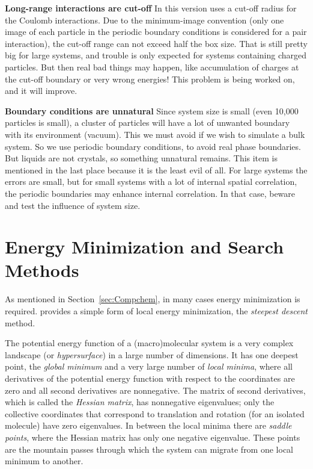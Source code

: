 {\bf Long-range interactions are cut-off}
In this version {\gromacs} uses a cut-off radius for the Coulomb
interactions. Due to the minimum-image convention (only one image of
each particle in the periodic boundary conditions is considered for a
pair interaction), the cut-off range can not exceed half the box
size. That is still pretty big for large systems, and trouble is only
expected for systems containing charged particles. But then real bad
things may happen, like accumulation of charges at the cut-off
boundary or very wrong energies! This problem is being worked on, and
it will improve.

{\bf Boundary conditions are unnatural}
Since system size is small (even 10,000 particles is small), a cluster
of particles will have a lot of unwanted boundary with its environment
(vacuum). This we must avoid if we wish to simulate a bulk system. So
we use periodic boundary conditions, to avoid real phase
boundaries. But liquids are not crystals, so something unnatural
remains. This item is mentioned in the last place because it is the
least evil of all. For large systems the errors are small, but for
small systems with a lot of internal spatial correlation, the periodic
boundaries may enhance internal correlation. In that case, beware and
test the influence of system size.

\section{Energy Minimization and Search Methods}

As mentioned in Section~\ref{sec:Compchem}, in many cases energy
minimization is required. {\gromacs} provides a simple form of local
energy minimization, the {\em steepest descent} method.

The potential energy function of a (macro)molecular system is a very
complex landscape (or {\em hypersurface}) in a large number of
dimensions. It has one deepest point, the {\em global minimum} and a
very large number of {\em local minima}, where all derivatives of the
potential energy function with respect to the coordinates are zero and
all second derivatives are nonnegative. The matrix of second
derivatives, which is called the {\em Hessian matrix}, has nonnegative
eigenvalues; only the collective coordinates that correspond to
translation and rotation (for an isolated molecule) have zero
eigenvalues. In between the local minima there are {\em saddle
points}, where the Hessian matrix has only one negative
eigenvalue. These points are the mountain passes through which the
system can migrate from one local minimum to another.

